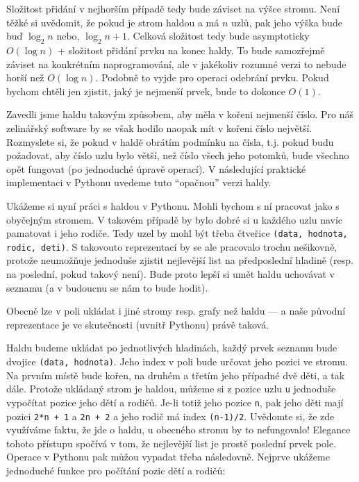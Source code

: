Složitost přidání v nejhorším případě tedy bude záviset na výšce stromu. Není těžké si uvědomit, že pokud je strom haldou a má $n$
uzlů, pak jeho výška bude buď $\log_2 n$ nebo,  $\log_2 n + 1$. Celková složitost tedy bude asymptoticky $O(\log n)$ + složitost
přidání prvku na konec haldy. To bude samozřejmě záviset na konkrétním naprogramování, ale v jakékoliv rozumné verzi to nebude
horší než $O(\log n)$. Podobně to vyjde pro operaci odebrání prvku. Pokud bychom chtěli jen zjistit, jaký je nejmenší prvek,
bude to dokonce $O(1)$. 

Zavedli jsme haldu takovým způsobem, aby měla v kořeni nejmenší číslo. Pro náš zelinářský software by se však 
hodilo naopak mít v kořeni číslo největší. Rozmyslete si, že pokud v haldě obrátím podmínku na čísla, t.j. pokud budu požadovat,
aby číslo uzlu bylo větší, než číslo všech jeho potomků, bude všechno opět fungovat (po jednoduché úpravě operací). V následující
praktické implementaci v Pythonu uvedeme tuto ``opačnou'' verzi haldy.

Ukážeme si nyní práci s haldou v Pythonu. Mohli bychom s ní pracovat jako s obyčejným stromem. V takovém případě by bylo dobré si u každého
uzlu navíc pamatovat i jeho rodiče. Tedy uzel by mohl být třeba čtveřice {\tt (data, hodnota, rodic, deti)}. S takovouto reprezentací
by se ale pracovalo trochu nešikovně, protože neumožňuje jednoduše zjistit nejlevější list na předposlední hladině (resp. na poslední, pokud takový není).
Bude proto lepší si umět haldu uchovávat v seznamu (a v budoucnu se nám to bude hodit). 

\begin{todo}
Obecně lze v poli ukládat i jiné stromy resp. grafy než haldu --- a naše původní reprezentace je ve skutečnosti (uvnitř Pythonu)
právě taková.
\end{todo}

Haldu budeme ukládat po jednotlivých hladinách, každý prvek seznamu bude dvojice {\tt (data, hodnota)}. Jeho index v poli bude určovat jeho pozici ve stromu. 
Na prvním místě bude kořen, na druhém a třetím jeho případné dvě děti, a tak dále. Protože ukládaný strom je haldou, můžeme si z pozice uzlu {\tt u} jednoduše vypočítat
pozice jeho dětí a rodičů. Je-li totiž jeho pozice {\tt n}, pak jeho děti mají pozici {\tt 2*n + 1} a {\tt 2n + 2} a jeho rodič má index
{\tt (n-1)/2}. Uvědomte si, že zde využíváme faktu, že jde o haldu, u obecného stromu by to nefungovalo! Elegance tohoto přístupu spočívá v tom, 
že nejlevější list je prostě poslední prvek pole. Operace v Pythonu pak můžou vypadat třeba následovně. Nejprve ukážeme jednoduché
funkce pro počítání pozic dětí a rodičů:

